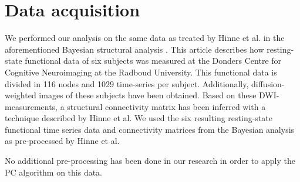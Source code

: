 \documentclass[a4paper, 10pt, english, onecolumn]{article}
\begin{document}
{}


\appendix
\section{Data acquisition}\label{sec:data}
We performed our analysis on the same data as treated by Hinne et al. in the aforementioned Bayesian structural analysis \cite{hinne2013, hinne2013structfunc}.
This article describes how resting-state functional data of six subjects was measured at the Donders Centre for Cognitive Neuroimaging at the Radboud University.
This functional data is divided in 116 nodes and 1029 time-series per subject.
Additionally, diffusion-weighted images of these subjects have been obtained.
Based on these DWI-measurements, a structural connectivity matrix has been inferred with a technique described by Hinne et al.
We used the six resulting resting-state functional time series data and connectivity matrices from the Bayesian analysis as pre-processed by Hinne et al.

No additional pre-processing has been done in our research in order to apply the PC algorithm on this data.
\end{document}
